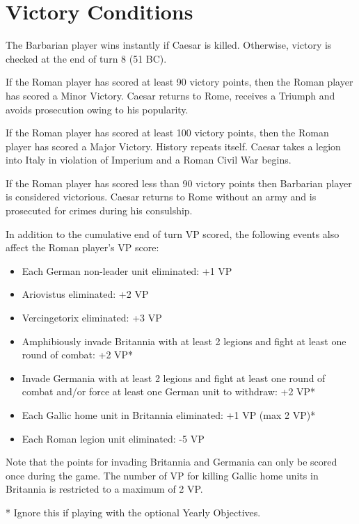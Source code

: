 \section{Victory Conditions}
\par
The Barbarian player wins instantly if Caesar is killed. Otherwise, victory is checked at the end of turn 8 (51 BC).

If the Roman player has scored at least 90 victory points, then the Roman player has scored a Minor Victory. Caesar returns to Rome, receives a Triumph and avoids prosecution owing to his popularity.

If the Roman player has scored at least 100 victory points, then the Roman player has scored a Major Victory. History repeats itself. Caesar takes a legion into Italy in violation of Imperium and a Roman Civil War begins.

If the Roman player has scored less than 90 victory points then Barbarian player is considered victorious. Caesar returns to Rome without an army and is prosecuted for crimes during his consulship.

In addition to the cumulative end of turn VP scored, the following events also affect the Roman player's VP score:

\begin{itemize}
  \setlength\itemsep{0em}
  \item Each German non-leader unit eliminated: +1 VP
  \item Ariovistus eliminated: +2 VP
  \item Vercingetorix eliminated: +3 VP
  \item Amphibiously invade Britannia with at least 2 legions and fight at least one round of combat: +2 VP*
  \item Invade Germania with at least 2 legions and fight at least one round of combat and/or force at least one German unit to withdraw: +2 VP*
  \item Each Gallic home unit in Britannia eliminated: +1 VP (max 2 VP)*
  \item Each Roman legion unit eliminated: -5 VP
\end{itemize}

Note that the points for invading Britannia and Germania can only be scored once during the game. The number of VP for killing Gallic home units in Britannia is restricted to a maximum of 2 VP.

* Ignore this if playing with the optional Yearly Objectives.